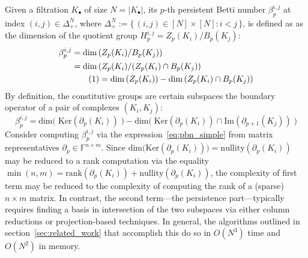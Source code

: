 \documentclass[10pt]{article}
\numberwithin{equation}{section}
\newcommand{\+}{%
	\raisebox{0.18ex}{\scaleobj{0.55}{+}}
}
\theoremstyle{definition}
\newcommand\numberthis{\addtocounter{equation}{1}\tag{\theequation}}
\begin{document}
Given a filtration $K_\bullet$ of size $N = \lvert K_\bullet \rvert$, its $p$-th persistent Betti number $\beta_p^{i,j}$ at index $(i,j) \in \Delta_+^N$, where $\Delta_+^N  := \{ \, (i,j) \in [N] \times [N] : i < j \, \}$, is defined as as the dimension of the quotient group $H_p^{i,j} = Z_p(K_i) / B_p(K_j)$: 
\begin{align*} \label{eq:pbn}
	\centering
	\beta_p^{i,j} &= \mathrm{dim} \left ( Z_p(K_i) / B_p(K_j) \right ) \\
	& = \mathrm{dim} \left( Z_p(K_i) / (Z_p(K_i) \cap B_p(K_j) \right) \\
	& \numberthis = \mathrm{dim} \left( Z_p(K_i) \right) - \mathrm{dim}\left( Z_p(K_i) \cap B_p(K_j) \right ) 
\end{align*}
By definition, the constitutive groups are certain subspaces the boundary operator of a pair of complexes $(K_i, K_j)$: 
\begin{equation}\label{eq:pbn_simple}
	\beta_p^{i,j} = \mathrm{dim}\big( \; \mathrm{Ker}(\partial_p(K_i)) \; \big) - \mathrm{dim}\big( \; \mathrm{Ker}(\partial_p(K_i)) \cap \mathrm{Im}(\partial_{p+1}(K_j)) \; \big) 
\end{equation}
Consider computing $\beta_p^{i,j}$ via the expression~\eqref{eq:pbn_simple} from matrix representatives $\partial_p \in \mathbb{F}^{n \times m}$.
Since $\mathrm{dim}\big(\mathrm{Ker}(\partial_p(K_i))\big) = \mathrm{nullity}(\partial_p(K_i))$ may be reduced to a rank computation via the equality $\min(n,m) = \mathrm{rank}(\partial_p(K_i)) + \mathrm{nullity}(\partial_p(K_i))$, the complexity of first term may be reduced to the complexity of computing the rank of a (sparse) $n \times m$ matrix. 
In contrast, the second term---the persistence part---typically requires finding a basis in intersection of the two subspaces via either column reductions or projection-based techniques. In general, the algorithms outlined in section~\ref{sec:related_work} that accomplish this do so in $O(N^3)$ time and $O(N^2)$ in memory.
\end{document}
